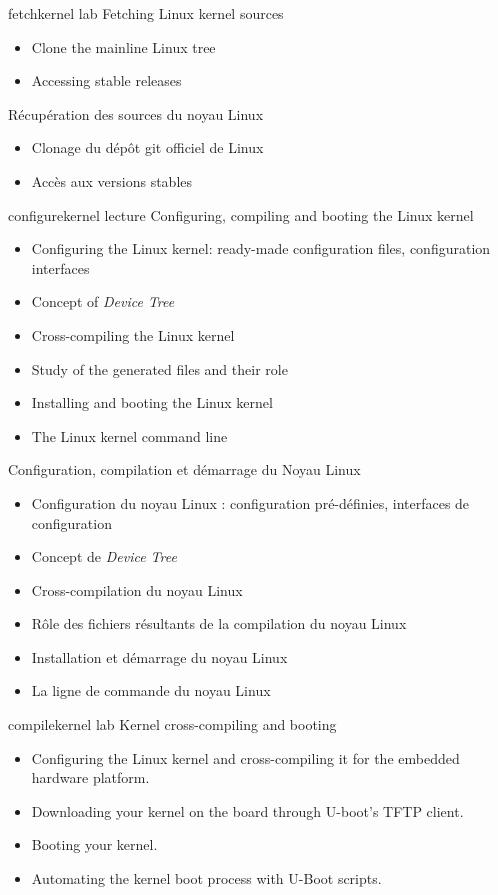 {fetchkernel}
{lab}
{Fetching Linux kernel sources}
{
  \begin{itemize}
  \item Clone the mainline Linux tree
  \item Accessing stable releases
  \end{itemize}
}
{Récupération des sources du noyau Linux}
{
  \begin{itemize}
  \item Clonage du dépôt git officiel de Linux
  \item Accès aux versions stables
  \end{itemize}
}
{configurekernel}
{lecture}
{Configuring, compiling and booting the Linux kernel}
{
  \begin{itemize}
  \item Configuring the Linux kernel: ready-made configuration files,
    configuration interfaces
  \item Concept of {\em Device Tree}
  \item Cross-compiling the Linux kernel
  \item Study of the generated files and their role
  \item Installing and booting the Linux kernel
  \item The Linux kernel command line
  \end{itemize}
}
{Configuration, compilation et démarrage du Noyau Linux}
{
  \begin{itemize}
  \item Configuration du noyau Linux : configuration pré-définies,
    interfaces de configuration
  \item Concept de {\em Device Tree}
  \item Cross-compilation du noyau Linux
  \item Rôle des fichiers résultants de la compilation du noyau Linux
  \item Installation et démarrage du noyau Linux
  \item La ligne de commande du noyau Linux
  \end{itemize}
}
{compilekernel}
{lab}
{Kernel cross-compiling and booting}
{
  \begin{itemize}
  \item Configuring the Linux kernel and cross-compiling it for the
    embedded hardware platform.
  \item Downloading your kernel on the board through U-boot's TFTP
    client.
  \item Booting your kernel.
  \item Automating the kernel boot process with U-Boot scripts.
  \end{itemize}
}
